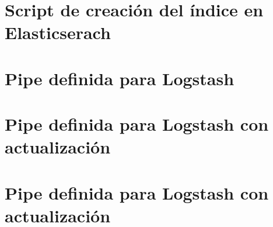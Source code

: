 \newpage
\chapter{Script de creación del índice en Elasticserach}\label{apendG}


\newpage
\chapter{Pipe definida para Logstash}\label{apendH}



\newpage

\chapter{Pipe definida para Logstash con actualización\label{apendI}}



\newpage
\chapter{Pipe definida para Logstash con actualización\label{apendJ}}

